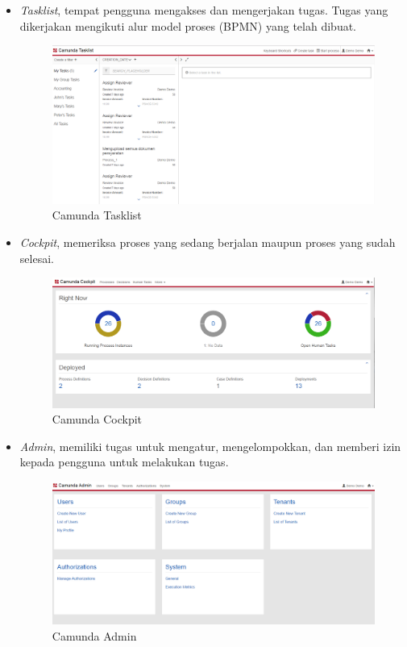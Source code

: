 \begin{itemize}
	
	\item \textit{Tasklist}, tempat pengguna mengakses dan mengerjakan tugas. Tugas yang dikerjakan mengikuti alur model proses (BPMN) yang telah dibuat. 
		\begin{figure}[H]
			\centering
			\includegraphics[scale=0.4]{Gambar/Bab-2/bpms/camundaTaskList}
			\caption{Camunda Tasklist} 
			\label{fig:camundatasklist}
		\end{figure}
	
	\item \textit{Cockpit}, memeriksa proses yang sedang berjalan maupun proses yang sudah selesai.
	\begin{figure}[H]
	\centering
	\includegraphics[scale=0.4]{Gambar/Bab-2/bpms/camundaCockpit}
	\caption{Camunda Cockpit} 
	\label{fig:camundacockpit}
\end{figure}
	
\item \textit{Admin}, memiliki tugas untuk mengatur, mengelompokkan, dan memberi izin kepada pengguna untuk melakukan tugas.
	\begin{figure}[H]
	\centering
	\includegraphics[scale=0.4]{Gambar/Bab-2/bpms/camundaAdmin}
	\caption{Camunda Admin} 
	\label{fig:camundaadmin}
\end{figure}


\end{itemize}
